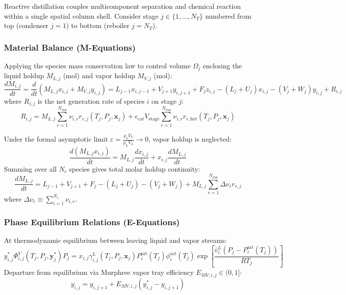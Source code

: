 \documentclass[11pt,a4paper]{article}
\begin{document}
Reactive distillation couples multicomponent separation and chemical reaction within a single spatial column shell. Consider stage $j \in \{1, \dots, N_T\}$ numbered from top (condenser $j=1$) to bottom (reboiler $j=N_T$).

\subsubsection{Material Balance (M-Equations)}
Applying the species mass conservation law to control volume $\Omega_j$ enclosing the liquid holdup $M_{L,j}$ (mol) and vapor holdup $M_{V,j}$ (mol):
\begin{equation}
\frac{d M_{i,j}}{dt} = \frac{d}{dt} \left( M_{L,j} x_{i,j} + M_{V,j} y_{i,j} \right) = L_{j-1} x_{i,j-1} + V_{j+1} y_{i,j+1} + F_j z_{i,j} - (L_j + U_j) x_{i,j} - (V_j + W_j) y_{i,j} + R_{i,j}
\end{equation}
where $R_{i,j}$ is the net generation rate of species $i$ on stage $j$:
\begin{equation}
R_{i,j} = M_{L,j} \sum_{r=1}^{N_{\text{rxn}}} \nu_{i,r} r_{r,j}(T_j, P_j, \mathbf{x}_j) + \epsilon_{\text{cat}} V_{\text{stage}} \sum_{r=1}^{N_{\text{rxn}}} \nu_{i,r} r_{r,\text{het}}(T_j, P_j, \mathbf{x}_j)
\end{equation}

Under the formal asymptotic limit $\varepsilon = \frac{\rho_V V_V}{\rho_L V_L} \to 0$, vapor holdup is neglected:
\begin{equation}
\frac{d (M_{L,j} x_{i,j})}{dt} = M_{L,j} \frac{d x_{i,j}}{dt} + x_{i,j} \frac{d M_{L,j}}{dt}
\end{equation}
Summing over all $N_c$ species gives total molar holdup continuity:
\begin{equation}
\frac{d M_{L,j}}{dt} = L_{j-1} + V_{j+1} + F_j - (L_j + U_j) - (V_j + W_j) + M_{L,j} \sum_{r=1}^{N_{\text{rxn}}} \Delta \nu_r r_{r,j}
\end{equation}
where $\Delta \nu_r \equiv \sum_{i=1}^{N_c} \nu_{i,r}$.

\subsubsection{Phase Equilibrium Relations (E-Equations)}
At thermodynamic equilibrium between leaving liquid and vapor streams:
\begin{equation}
y_{i,j}^* \Phi_{i,j}^V(T_j, P_j, \mathbf{y}_j^*) P_j = x_{i,j} \gamma_{i,j}^L(T_j, P_j, \mathbf{x}_j) P_i^{\text{sat}}(T_j) \phi_i^{\text{sat}}(T_j) \exp\left[ \frac{\bar{v}_i^L(P_j - P_i^{\text{sat}}(T_j))}{R T_j} \right]
\end{equation}
Departure from equilibrium via Murphree vapor tray efficiency $E_{MV,i,j} \in (0, 1]$:
\begin{equation}
y_{i,j} = y_{i,j+1} + E_{MV,i,j} \left( y_{i,j}^* - y_{i,j+1} \right)
\end{equation}
\end{document}
